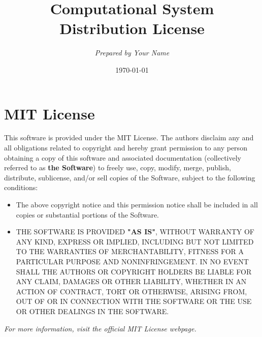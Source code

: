 \documentclass[12pt]{article}
\title{\textbf{Computational System Distribution License}}
\author{\textit{Prepared by Your Name}}
\date{\today}
\begin{document}
\maketitle

\section*{\centering MIT License}
\noindent
This software is provided under the MIT License. The authors disclaim any and all obligations related to copyright and hereby grant permission to any person obtaining a copy of this software and associated documentation (collectively referred to as \textbf{the Software}) to freely use, copy, modify, merge, publish, distribute, sublicense, and/or sell copies of the Software, subject to the following conditions:

\begin{itemize}
    \item The above copyright notice and this permission notice shall be included in all copies or substantial portions of the Software.
    \item THE SOFTWARE IS PROVIDED \textbf{"AS IS"}, WITHOUT WARRANTY OF ANY KIND, EXPRESS OR IMPLIED, INCLUDING BUT NOT LIMITED TO THE WARRANTIES OF MERCHANTABILITY, FITNESS FOR A PARTICULAR PURPOSE AND NONINFRINGEMENT. IN NO EVENT SHALL THE AUTHORS OR COPYRIGHT HOLDERS BE LIABLE FOR ANY CLAIM, DAMAGES OR OTHER LIABILITY, WHETHER IN AN ACTION OF CONTRACT, TORT OR OTHERWISE, ARISING FROM, OUT OF OR IN CONNECTION WITH THE SOFTWARE OR THE USE OR OTHER DEALINGS IN THE SOFTWARE.
\end{itemize}

\vspace{1cm}
\noindent
\textit{For more information, visit the official MIT License webpage.}
\end{document}
